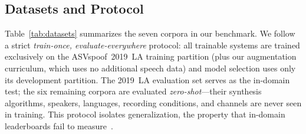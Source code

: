 
\subsection{Datasets and Protocol}
\label{ssec:datasets}

Table~\ref{tab:datasets} summarizes the seven corpora in our benchmark. We follow a
strict \emph{train-once, evaluate-everywhere} protocol: all trainable systems are
trained exclusively on the ASVspoof~2019~LA training partition (plus our augmentation
curriculum, which uses no additional speech data) and model selection uses only its
development partition. The 2019~LA evaluation set serves as the in-domain test; the six
remaining corpora are evaluated \emph{zero-shot}---their synthesis algorithms,
speakers, languages, recording conditions, and channels are never seen in training.
This protocol isolates generalization, the property that in-domain leaderboards fail to
measure~\cite{muller2022inthewild,muller2024harder}.

\begin{table}[t]
\centering
\caption{Benchmark evaluation corpora grouped by protocol role and evaluation objective.}
\label{tab:datasets}
\setlength{\tabcolsep}{3pt}
\footnotesize
{}
\end{table}

